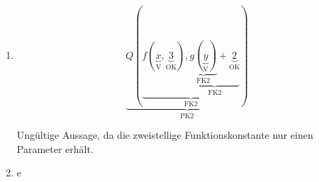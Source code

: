 \documentclass[a4paper]{article}
\begin{document}
\begin{enumerate}
\begin{enumerate}
			\item
			\begin{equation*}
				\underbrace{Q(\underbrace{f(\underbrace{x}_{\text{V}}, \underbrace{3}_{\text{OK}}), \underbrace{  \underbrace{g(\underbrace{y}_{\text{V}})}_{\text{FK2}}+ \underbrace{2}_{\text{OK}}}_{\text{FK2}}}_{\text{FK2}})}_{\text{PK2}}
			\end{equation*}
			\begin{center}
				Ungültige Aussage, da die zweistellige Funktionskonstante nur einen Parameter erhält.
			\end{center}
			
			\item e
		\end{enumerate}
	\end{enumerate}
\end{document}
